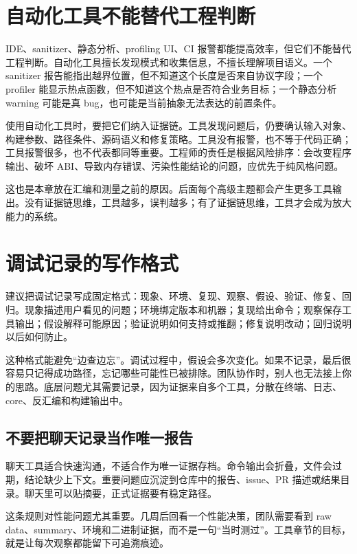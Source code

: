 \section{自动化工具不能替代工程判断}

IDE、sanitizer、静态分析、profiling UI、CI 报警都能提高效率，但它们不能替代工程判断。自动化工具擅长发现模式和收集信息，不擅长理解项目语义。一个 sanitizer 报告能指出越界位置，但不知道这个长度是否来自协议字段；一个 profiler 能显示热点函数，但不知道这个热点是否符合业务目标；一个静态分析 warning 可能是真 bug，也可能是当前抽象无法表达的前置条件。

使用自动化工具时，要把它们纳入证据链。工具发现问题后，仍要确认输入对象、构建参数、路径条件、源码语义和修复策略。工具没有报警，也不等于代码正确；工具报警很多，也不代表都同等重要。工程师的责任是根据风险排序：会改变程序输出、破坏 ABI、导致内存错误、污染性能结论的问题，应优先于纯风格问题。

这也是本章放在汇编和测量之前的原因。后面每个高级主题都会产生更多工具输出。没有证据链思维，工具越多，误判越多；有了证据链思维，工具才会成为放大能力的系统。

\section{调试记录的写作格式}

建议把调试记录写成固定格式：现象、环境、复现、观察、假设、验证、修复、回归。现象描述用户看见的问题；环境绑定版本和机器；复现给出命令；观察保存工具输出；假设解释可能原因；验证说明如何支持或推翻；修复说明改动；回归说明以后如何防止。

这种格式能避免“边查边忘”。调试过程中，假设会多次变化。如果不记录，最后很容易只记得成功路径，忘记哪些可能性已被排除。团队协作时，别人也无法接上你的思路。底层问题尤其需要记录，因为证据来自多个工具，分散在终端、日志、core、反汇编和构建输出中。

\subsection{不要把聊天记录当作唯一报告}

聊天工具适合快速沟通，不适合作为唯一证据存档。命令输出会折叠，文件会过期，结论缺少上下文。重要问题应沉淀到仓库中的报告、issue、PR 描述或结果目录。聊天里可以贴摘要，正式证据要有稳定路径。

这条规则对性能问题尤其重要。几周后回看一个性能决策，团队需要看到 raw data、summary、环境和二进制证据，而不是一句“当时测过”。工具章节的目标，就是让每次观察都能留下可追溯痕迹。

